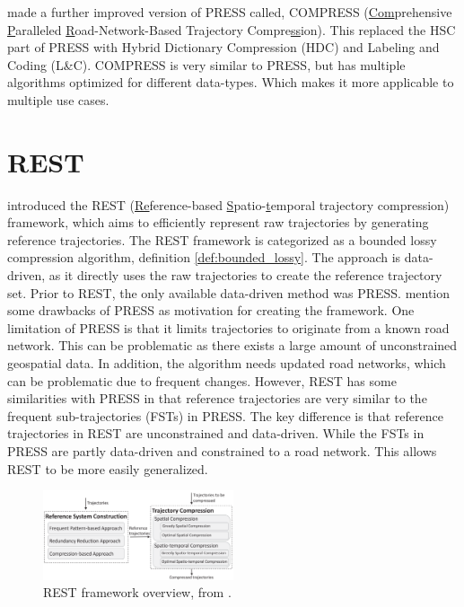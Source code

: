 \textcite{han2017compress} made a further improved version of PRESS called, COMPRESS (\underline{Com}prehensive \underline{P}aralleled \underline{R}oad-Network-Based Trajectory Compre\underline{ss}ion). This replaced the HSC part of PRESS with Hybrid Dictionary Compression (HDC) and Labeling and Coding (L\&C). COMPRESS is very similar to PRESS, but has multiple algorithms optimized for different data-types. Which makes it more applicable to multiple use cases.



\section{REST}
\label{sec:REST}
\textcite{zhao2018rest} introduced the REST (\underline{Re}ference-based \underline{S}patio-\underline{t}emporal trajectory compression) framework, which aims to efficiently represent raw trajectories by generating reference trajectories. The REST framework is categorized as a bounded lossy compression algorithm, definition \ref{def:bounded_lossy}. The approach is data-driven, as it directly uses the raw trajectories to create the reference trajectory set. Prior to REST, the only available data-driven method was PRESS. \textcite{zhao2018rest} mention some drawbacks of PRESS as motivation for creating the framework. One limitation of PRESS is that it limits trajectories to originate from a known road network. This can be problematic as there exists a large amount of unconstrained geospatial data. In addition, the algorithm needs updated road networks, which can be problematic due to frequent changes. However, REST has some similarities with PRESS in that reference trajectories are very similar to the frequent sub-trajectories (FSTs) in PRESS. The key difference is that reference trajectories in REST are unconstrained and data-driven. While the FSTs in PRESS are partly data-driven and constrained to a road network. This allows REST to be more easily generalized.

\begin{figure}
    \includegraphics[width=0.5\textwidth]{./figures/rest_structure.png}
    \caption{REST framework overview, from \textcite{zhao2018rest}.}
    \label{fig:rest_overview}
\end{figure}

